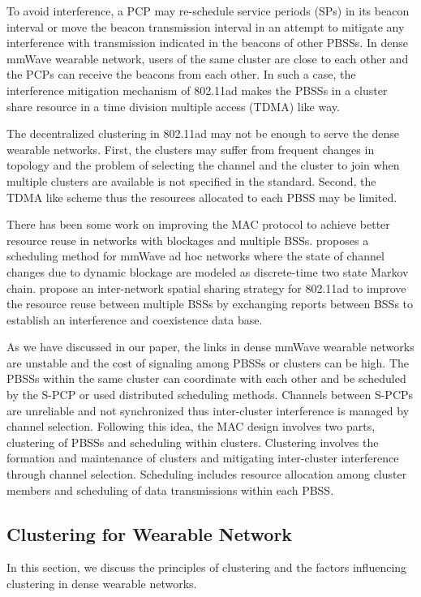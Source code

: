 \documentclass[10pt, conference, letterpaper]{IEEEtran}
\begin{document}
To avoid interference, a PCP may re-schedule service periods (SPs) in its beacon interval or move the beacon transmission interval in an attempt to mitigate any interference with transmission indicated in the beacons of other PBSSs. In dense mmWave wearable network, users of the same cluster are close to each other and the PCPs can receive the beacons from each other. In such a case, the interference mitigation mechanism of 802.11ad makes the PBSSs in a cluster share resource in a time division multiple access (TDMA) like way.

The decentralized clustering in 802.11ad may not be enough to serve the dense wearable networks.
First, the clusters may suffer from frequent changes in topology and the problem of selecting the channel and the cluster to join when multiple clusters are available is not specified in the standard. 
Second, the TDMA like scheme thus the resources allocated to each PBSS may be limited. 

There has been some work on improving the MAC protocol to achieve better resource reuse in networks with blockages and multiple BSSs.
\cite{onlinkscheduling} proposes a scheduling method for mmWave ad hoc networks where the state of channel changes due to dynamic blockage are modeled as discrete-time two state Markov chain. 
\cite{intersharing} propose an inter-network spatial sharing strategy for 802.11ad to improve the resource reuse between multiple BSSs by exchanging reports between BSSs to establish an interference and coexistence data base.

As we have discussed in our paper, the links in dense mmWave wearable networks are unstable and the cost of signaling among PBSSs or clusters can be high. 
The PBSSs within the same cluster can coordinate with each other and be scheduled by the S-PCP or used distributed scheduling methods. 
Channels between S-PCPs are unreliable and not synchronized thus inter-cluster interference is managed by channel selection. 
Following this idea, the MAC design involves two parts, clustering of PBSSs and scheduling within clusters.   
Clustering involves the formation and maintenance of clusters and mitigating inter-cluster interference through channel selection. 
Scheduling includes resource allocation among cluster members and scheduling of data transmissions within each PBSS.

\subsection{Clustering for Wearable Network}\label{section:MAC:clustering}
In this section, we discuss the principles of clustering and the factors influencing clustering in dense wearable networks.
\end{document}
